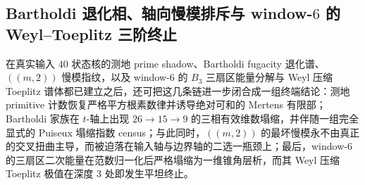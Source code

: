 \subsection{Bartholdi 退化相、轴向慢模排斥与 window-\texorpdfstring{$6$}{6} 的 Weyl--Toeplitz 三阶终止}\label{subsec:conclusion-bartholdi-slowmode-weyl-toeplitz-termination}
在真实输入 \(40\) 状态核的测地 prime shadow、Bartholdi fugacity 退化谱、\(((m,2))\) 慢模指纹，以及 window-\(6\) 的 \(B_3\) 三扇区能量分解与 Weyl 压缩 Toeplitz 谱体都已建立之后，还可把这几条链进一步闭合成一组终端结论：测地 primitive 计数恢复严格平方根素数律并诱导绝对可和的 Mertens 有限部；Bartholdi 家族在 \(t\)-轴上出现 \(26\to 15\to 9\) 的三相有效维数塌缩，并伴随一组完全显式的 Puiseux 塌缩指数 census；与此同时，\(((m,2))\) 的最坏慢模永不由真正的交叉扭曲主导，而被迫落在输入轴与边界轴的二选一瓶颈上；最后，window-\(6\) 的三扇区二次能量在范数归一化后严格塌缩为一维锥角层析，而其 Weyl 压缩 Toeplitz 极值在深度 \(3\) 处即发生平坦终止。

